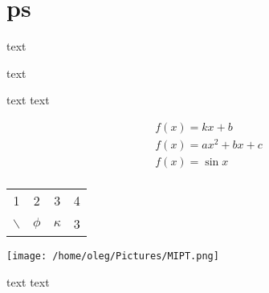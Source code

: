 \section{ps}
text

\vspace{10pt} 

text
\par
text \hspace*{10pt} text

\begin{gather}
    f(x)=kx+b \\
    f(x)=ax^2+bx+c \\
    f(x)=\sin x \\
\end{gather}


\newpage
\begin{tabular}{||c|c|c|c||}
    1&2&3&4\\
    \cline{1-2}
    \cline{1-4} 
    $\backslash$&$\phi$&$\kappa$&3\\
\end{tabular}

\texttt{[image: /home/oleg/Pictures/MIPT.png]}

\newpage
text
\textrm{text}
 